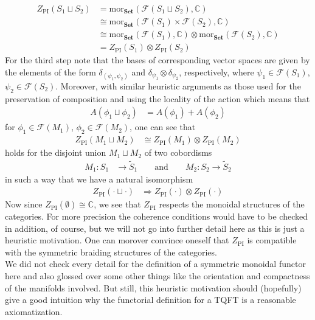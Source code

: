 \begin{align*}
  Z_{\mathrm{PI}}
  \left(
    S_{1}
    \sqcup
    S_{2}
  \right)
  &=
  \mathrm{mor}_{\mathbf{Set}}
  \left(
    \mathcal{F}(S_{1} \sqcup S_{2})
    ,
    \mathbb{C}
  \right)
  \\
  &\cong
  \mathrm{mor}_{\mathbf{Set}}
  \left(
    \mathcal{F}(S_{1})
    \times
    \mathcal{F}(S_{2})
    ,
    \mathbb{C}
  \right)
  \\
  &\cong
  \mathrm{mor}_{\mathbf{Set}}
  \left(
    \mathcal{F}(S_{1})
    ,
    \mathbb{C}
  \right)
  \otimes
  \mathrm{mor}_{\mathbf{Set}}
  \left(
    \mathcal{F}(S_{2})
    ,
    \mathbb{C}
  \right)
  \\
  &=
  Z_{\mathrm{PI}}(S_{1})
  \otimes
  Z_{\mathrm{PI}}(S_{2})
\end{align*}
For the third step note that the bases of corresponding vector spaces are given by the elements of the form $\delta_{(\psi_{1},\psi_{2})}$ and $\delta_{\psi_{1}} \otimes \delta_{\psi_{2}}$, respectively, where $\psi_{1} \in \mathcal{F}(S_{1})$, $\psi_{2} \in \mathcal{F}(S_{2})$. Moreover, with similar heuristic arguments as those used for the preservation of composition and using the locality of the action which means that
\begin{align*}
  A(\phi_{1} \sqcup \phi_{2})
  &=
  A(\phi_{1})
  +
  A(\phi_{2})
\end{align*}
for $\phi_{1} \in \mathcal{F}(M_{1})$, $\phi_{2} \in \mathcal{F}(M_{2})$, one can see that
\begin{align*}
  Z_{\mathrm{PI}}
  \left(
    M_{1}
    \sqcup
    M_{2}
  \right)
  &\cong
  Z_{\mathrm{PI}}(M_{1})
  \otimes
  Z_{\mathrm{PI}}(M_{2})
\end{align*}
holds for the disjoint union $M_{1} \sqcup M_{2}$ of two cobordisms
\begin{align*}
  M_{1}
  \colon S_{1}
  &\to
  \tilde{S}_{1}
  \qquad
  \text{and}
  \qquad
  M_{2}
  \colon
  S_{2}
  \to
  \tilde{S}_{2}
\end{align*}
in such a way that we have a natural isomorphism
\begin{align*}
  Z_{\mathrm{PI}}(\cdot \sqcup \cdot)
  &\Rightarrow
  Z_{\mathrm{PI}}(\cdot) \otimes Z_{\mathrm{PI}}(\cdot)
\end{align*}
Now since $Z_{\mathrm{PI}}(\emptyset) \cong \mathbb{C}$, we see that $Z_{\mathrm{PI}}$ respects the monoidal structures of the categories. For more precision the coherence conditions would have to be checked in addition, of course, but we will not go into further detail here as this is just a heuristic motivation. One can morover convince oneself that $Z_{\mathrm{PI}}$ is compatible with the symmetric braiding structures of the categories.
\\
We did not check every detail for the definition of a symmetric monoidal functor here and also glossed over some other things like the orientation and compactness of the manifolds involved. But still, this heuristic motivation should (hopefully) give a good intuition why the functorial definition for a TQFT is a reasonable axiomatization.
